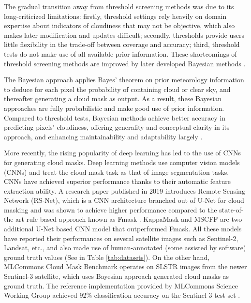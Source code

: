 \documentclass[sigplan,screen]{acmart}
\begin{document}
The gradual transition away from threshold screening methods was due to its long-criticized limitations: firstly, threshold settings rely heavily on domain expertise about indicators of cloudiness that may not be objective, which also makes later modification and updates difficult; secondly, thresholds provide users little flexibility in the trade-off between coverage and accuracy; third, threshold tests do not make use of all available prior information. These shortcomings of threshold screening methods are improved by later developed Bayesian methods \cite{Merchant2005ProbabilisticPB}.

The Bayesian approach applies Bayes' theorem on prior meteorology information to deduce for each pixel the probability of containing cloud or clear sky, and thereafter generating a cloud mask as output. As a result, these Bayesian approaches are fully probabilistic and make good use of prior information. Compared to threshold tests, Bayesian methods achieve better accuracy in predicting pixels' cloudiness, offering generality and conceptual clarity in its approach, and enhancing maintainability and adaptability largely \cite{Merchant2005ProbabilisticPB}. 

More recently, the rising popularity of deep learning has led to the use of CNNs for generating cloud masks. Deep learning methods \cite{Li2019DeepLB,Domnich2021KappaMaskAC,Yan2018CloudAC,WIELAND2019111203,JEPPESEN2019247} use computer vision models (CNNs) and treat the cloud mask task as that of image segmentation tasks. CNNs have achieved superior performance thanks to their automatic feature extraction ability. A research paper published in 2019 \cite{JEPPESEN2019247} introduces Remote Sensing Network (RS-Net), which is a CNN architecture branched out of U-Net \cite{RFB15a} for cloud masking and was shown to achieve higher performance compared to the state-of-the-art rule-based approach known as Fmask \cite{Zhu2012ObjectbasedCA}. KappaMask \cite{Domnich2021KappaMaskAC} and MSCFF \cite{Li2019DeepLB} are two additional U-Net based CNN model that outperformed Fmask. All these models have reported their performances on several satellite images such as Sentinel-2, Landsat, etc., and also made use of human-annotated (some assisted by software) ground truth values (See in Table \ref{tab:datasets}). On the other hand, MLCommons Cloud Mask Benchmark operates on SLSTR images from the newer Sentinel-3 satellite, which uses Bayesian approach generated cloud masks as ground truth. The reference implementation provided by MLCommons Science Working Group achieved 92\% classification accuracy on the Sentinel-3 test set \cite{Thiyagalingam2022AIBF}.
\end{document}
